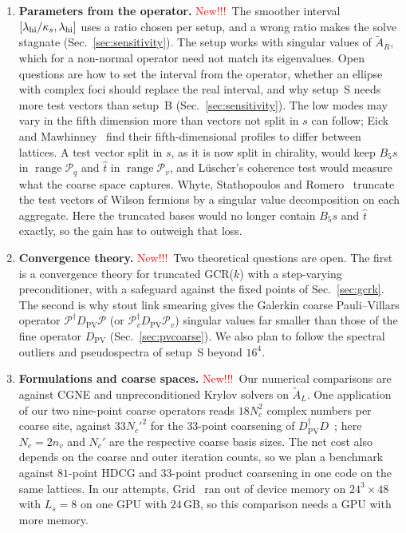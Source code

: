 \documentclass[11pt,a4paper]{article}
\newif\ifshownew \shownewtrue
\DeclareRobustCommand\New{\ifshownew\textcolor{red}{New!!!}\ \else\ignorespaces\fi}
\numberwithin{equation}{section}
\newcommand{\dg}{^{\dagger}}
\newcommand{\Dpv}{D_{\mathrm{PV}}}
\newcommand{\AR}{\tilde A_{R}}
\newcommand{\AL}{\tilde A_{L}}
\newcommand{\Pro}{\mathcal P}
\newcommand{\Pq}{\Pro_q}
\newcommand{\Pv}{\Pro_v}
\newif\ifresults
\begin{document}
\ifresults
\begin{enumerate}
\item \textbf{Parameters from the operator.} \New The smoother interval
$[\lambda_{\rm hi}/\kappa_s,\lambda_{\rm hi}]$ uses a ratio chosen per setup, and a wrong ratio
makes the solve stagnate (Sec.~\ref{sec:sensitivity}). The setup works with singular values of
$\AR$, which for a non-normal operator need not match its eigenvalues. Open questions are how to
set the interval from the operator, whether an ellipse with complex foci should replace the real
interval, and why setup~S needs more test vectors than setup~B (Sec.~\ref{sec:sensitivity}). The
low modes may vary in the fifth dimension more than vectors not split in $s$ can follow; Eick and
Mawhinney~\cite{EickMawhinney} find their fifth-dimensional profiles to differ between lattices.
A test vector split in $s$, as it is now split in chirality, would keep $B_5s$ in
$\operatorname{range}\Pq$ and $\hat t$ in $\operatorname{range}\Pv$, and L\"uscher's coherence test would measure what the coarse space captures.
Whyte, Stathopoulos and Romero~\cite{WhyteSVD} truncate the test vectors of Wilson fermions by a
singular value decomposition on each aggregate. Here the truncated bases would no longer contain
$B_5s$ and $\hat t$ exactly, so the gain has to outweigh that loss.

\item \textbf{Convergence theory.} \New Two theoretical questions are open. The first is a
convergence theory for truncated GCR($k$) with a step-varying preconditioner, with a safeguard
against the fixed points of Sec.~\ref{sec:gcrk}. The second is why stout link smearing gives the
Galerkin coarse Pauli--Villars operator $\Pro\dg\Dpv\Pro$ (or $\Pv\dg\Dpv\Pv$) singular values far smaller than those
of the fine operator $\Dpv$ (Sec.~\ref{sec:pvcoarse}). We also plan to follow the spectral
outliers and pseudospectra of setup~S beyond $16^4$.

\item \textbf{Formulations and coarse spaces.} \New Our numerical comparisons are against CGNE and
unpreconditioned Krylov solvers on $\AL$. One application of our two nine-point coarse operators
reads $18N_c^2$ complex numbers per coarse site, against $33N_c'^2$ for the $33$-point coarsening
of $\Dpv\dg D$~\cite{BoyleOare}; here $N_c=2n_v$ and $N_c'$ are the respective coarse basis
sizes. The net cost also depends on the coarse and outer iteration counts, so we plan a benchmark
against $81$-point HDCG and $33$-point product coarsening in one code on the same lattices. In our
attempts, Grid~\cite{Grid} ran out of device memory on $24^3\times48$ with $L_s=8$ on one GPU
with $24$\,GB, so this comparison needs a GPU with more memory.


\end{enumerate}
\end{document}
